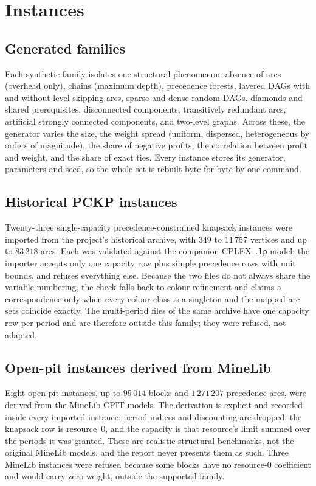 \section{Instances}
\label{sec:instances}


\subsection{Generated families}

Each synthetic family isolates one structural phenomenon: absence of arcs
(overhead only), chains (maximum depth), precedence forests, layered DAGs with
and without level-skipping arcs, sparse and dense random DAGs, diamonds and
shared prerequisites, disconnected components, transitively redundant arcs,
artificial strongly connected components, and two-level graphs. Across these,
the generator varies the size, the weight spread (uniform, dispersed,
heterogeneous by orders of magnitude), the share of negative profits, the
correlation between profit and weight, and the share of exact ties. Every
instance stores its generator, parameters and seed, so the whole set is
rebuilt byte for byte by one command.

\subsection{Historical PCKP instances}

Twenty-three single-capacity precedence-constrained knapsack instances were
imported from the project's historical archive, with $349$ to $11\,757$ vertices and
up to $83\,218$ arcs. Each was validated against the companion CPLEX \texttt{.lp}
model: the importer accepts only one capacity row plus simple precedence rows
with unit bounds, and refuses everything else. Because the two files do not
always share the variable numbering, the check falls back to colour refinement
and claims a correspondence only when every colour class is a singleton and the
mapped arc sets coincide exactly. The multi-period files of the same archive
have one capacity row per period and are therefore outside this family; they
were refused, not adapted.

\subsection{Open-pit instances derived from MineLib}

Eight open-pit instances, up to $99\,014$ blocks and $1\,271\,207$ precedence
arcs, were derived from the MineLib CPIT models. The derivation is explicit and
recorded inside every imported instance: period indices and discounting are
dropped, the knapsack row is resource~0, and the capacity is that resource's
limit summed over the periods it was granted. These are realistic structural
benchmarks, not the original MineLib models, and the report never presents them
as such. Three MineLib instances were refused because some blocks have no
resource-0 coefficient and would carry zero weight, outside the supported family.

